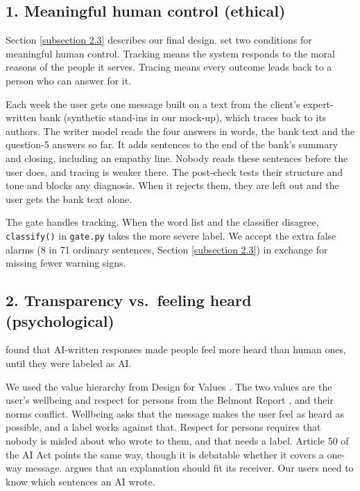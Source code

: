 \documentclass[a4paper]{article}
\begin{document}
\subsection*{1. Meaningful human control (ethical)}
Section \ref{subsection 2.3} describes our final design. \citet{santoni2018meaningful} set two conditions for meaningful human control. Tracking means the system responds to the moral reasons of the people it serves. Tracing means every outcome leads back to a person who can answer for it.

Each week the user gets one message built on a text from the client's expert-written bank (synthetic stand-ins in our mock-up), which traces back to its authors. The writer model reads the four answers in words, the bank text and the question-5 answers so far. It adds sentences to the end of the bank's summary and closing, including an empathy line. Nobody reads these sentences before the user does, and tracing is weaker there. The post-check tests their structure and tone and blocks any diagnosis. When it rejects them, they are left out and the user gets the bank text alone.

The gate handles tracking. When the word list and the classifier disagree, \texttt{classify()} in \texttt{gate.py} takes the more severe label. We accept the extra false alarms (8 in 71 ordinary sentences, Section \ref{subsection 2.3}) in exchange for missing fewer warning signs.

\subsection*{2. Transparency vs.\ feeling heard (psychological)}
\citet{yin2024heard} found that AI-written responses made people feel more heard than human ones, until they were labeled as AI.

We used the value hierarchy from Design for Values \citep{vandepoel2013translating, buijsman2025designforvalues}. The two values are the user's wellbeing and respect for persons from the Belmont Report \citeyearpar{belmont1979}, and their norms conflict. Wellbeing asks that the message makes the user feel as heard as possible, and a label works against that. Respect for persons requires that nobody is misled about who wrote to them, and that needs a label. Article 50 of the AI Act \citep{aiact2024} points the same way, though it is debatable whether it covers a one-way message. \citet{zednik2021blackbox} argues that an explanation should fit its receiver. Our users need to know which sentences an AI wrote.
\end{document}
